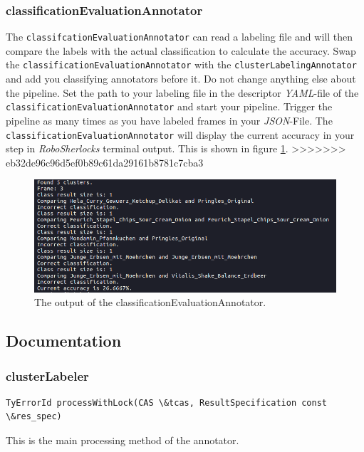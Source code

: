 \documentclass[main.tex]{subfiles}
\begin{document}
\subsubsection{classificationEvaluationAnnotator}
The \texttt{classifcationEvaluationAnnotator} can read a labeling file and will then compare the labels with the actual classification to calculate the accuracy. Swap the \texttt{classificationEvaluationAnnotator} with the \texttt{clusterLabelingAnnotator} and add you classifying annotators before it. Do not change anything else about the pipeline. Set the path to your labeling file in the descriptor \textit{YAML}-file of the \texttt{classificationEvaluationAnnotator} and start your pipeline. Trigger the pipeline as many times as you have labeled frames in your \textit{JSON}-File. The \texttt{classificationEvaluationAnnotator} will display the current accuracy in your step in \textit{RoboSherlocks} terminal output. This is shown in figure \ref{fig:classificationEvaluationAnnotator output}.
>>>>>>> eb32de96c96d5ef0b89c61da29161b8781c7cba3

\begin{figure}
  \includegraphics[width=\linewidth]{pictures/perception/accuracy.png}
  \caption{The output of the classificationEvaluationAnnotator.}
  \label{fig:classificationEvaluationAnnotator output}
\end{figure}

\subsection{Documentation}
\subsubsection{clusterLabeler}
\begin{lstlisting}
TyErrorId processWithLock(CAS \&tcas, ResultSpecification const \&res_spec)
\end{lstlisting}
This is the main processing method of the annotator.\\
\end{document}
